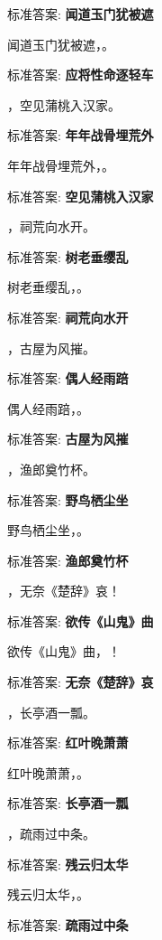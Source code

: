 \documentclass[12pt, a4paper, addpoints]{exam}
\begin{document}
\begin{questions}
标准答案: \textbf{闻道玉门犹被遮}

\question[1] 闻道玉门犹被遮，\uline{\qquad\qquad\qquad}。

标准答案: \textbf{应将性命逐轻车}

\question[1] \uline{\qquad\qquad\qquad}，空见蒲桃入汉家。

标准答案: \textbf{年年战骨埋荒外}

\question[1] 年年战骨埋荒外，\uline{\qquad\qquad\qquad}。

标准答案: \textbf{空见蒲桃入汉家}

\question[1] \uline{\qquad\qquad\qquad}，祠荒向水开。

标准答案: \textbf{树老垂缨乱}

\question[1] 树老垂缨乱，\uline{\qquad\qquad\qquad}。

标准答案: \textbf{祠荒向水开}

\question[1] \uline{\qquad\qquad\qquad}，古屋为风摧。

标准答案: \textbf{偶人经雨踣}

\question[1] 偶人经雨踣，\uline{\qquad\qquad\qquad}。

标准答案: \textbf{古屋为风摧}

\question[1] \uline{\qquad\qquad\qquad}，渔郎奠竹杯。

标准答案: \textbf{野鸟栖尘坐}

\question[1] 野鸟栖尘坐，\uline{\qquad\qquad\qquad}。

标准答案: \textbf{渔郎奠竹杯}

\question[1] \uline{\qquad\qquad\qquad}，无奈《楚辞》哀！

标准答案: \textbf{欲传《山鬼》曲}

\question[1] 欲传《山鬼》曲，\uline{\qquad\qquad\qquad}！

标准答案: \textbf{无奈《楚辞》哀}

\question[1] \uline{\qquad\qquad\qquad}，长亭酒一瓢。

标准答案: \textbf{红叶晚萧萧}

\question[1] 红叶晚萧萧，\uline{\qquad\qquad\qquad}。

标准答案: \textbf{长亭酒一瓢}

\question[1] \uline{\qquad\qquad\qquad}，疏雨过中条。

标准答案: \textbf{残云归太华}

\question[1] 残云归太华，\uline{\qquad\qquad\qquad}。

标准答案: \textbf{疏雨过中条}


\end{questions}
\end{document}
